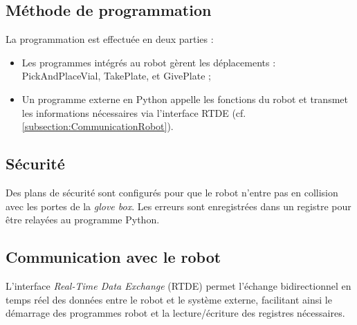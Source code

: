 \subsection{Méthode de programmation}
La programmation est effectuée en deux parties :
\begin{itemize}
    \item Les programmes intégrés au robot gèrent les déplacements : \og{}PickAndPlaceVial\fg{}, \og{}TakePlate\fg{}, et \og{}GivePlate\fg{} ;
    \item Un programme externe en Python appelle les fonctions du robot et transmet les informations nécessaires via l'interface RTDE (cf. \autoref{subsection:CommunicationRobot}).
\end{itemize}

\subsection{Sécurité}
Des plans de sécurité sont configurés pour que le robot n'entre pas en collision avec les portes de la \textit{glove box}. Les erreurs sont enregistrées dans un registre pour être relayées au programme Python.

\subsection{Communication avec le robot}\label{subsection:CommunicationRobot}
L'interface \textit{Real-Time Data Exchange} (RTDE) permet l'échange bidirectionnel en temps réel des données entre le robot et le système externe, facilitant ainsi le démarrage des programmes robot et la lecture/écriture des registres nécessaires.
